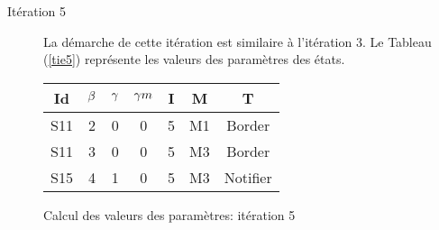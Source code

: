 \begin{Exemple}
\begin{description}
\item[Itération 5] La démarche de cette itération est similaire à l'itération 3. Le Tableau (\ref{tie5}) représente les valeurs des paramètres  des états.
\begin{tableth}
	\centering
	\begin{tabular}{|*{7}{c|}}
		\hline
		Id&$\beta{}$&	$\gamma{}$	&$\gamma m{}$ &	I&	M&	T\\ \hline
		S11&	2&	0&	0&	5&	M1&	Border\\ \hline
		S11&	3&	0&	0&	5&	M3&	Border\\ \hline
		S15&	4&	1&	0&	5&	M3&	Notifier\\ \hline
	\end{tabular}
	\caption{Calcul des valeurs des paramètres: itération 5}\label{tie5}
\end{tableth}

\end{description}	
\end{Exemple}